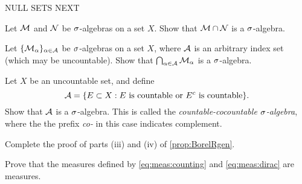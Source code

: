 \documentclass[main.tex]{subfiles}
\begin{document}
NULL SETS NEXT


\begin{exercises}
\item Let ${\mathcal M}$ and ${\mathcal N}$ be ${\sigma}$-algebras on a set $X$. Show that ${\mathcal M} \cap {\mathcal N}$ is a ${\sigma}$-algebra.

\item Let $\{{\mathcal M}_\alpha\}_{\alpha\in {\mathcal A}}$ be ${\sigma}$-algebras on a set $X$, where ${\mathcal A}$ is an arbitrary index set (which may be uncountable). Show that $\bigcap_{\alpha\in {\mathcal A}}{\mathcal M}_\alpha$ is a ${\sigma}$-algebra.

\item Let $X$ be an uncountable set, and define
\[
{\mathcal A} = \{ E \subset X : E \text{ is countable or } E^c \text{ is countable} \}.
\]
Show that ${\mathcal A}$ is a ${\sigma}$-algebra. This is called the \emph{countable-cocountable ${\sigma}$-algebra}, where the the prefix \emph{co-} in this case indicates complement.

\item Complete the proof of parts (iii) and (iv) of \cref{prop:BorelRgen}.

\item Prove that the measures defined by \cref{eq:meas:counting} and \cref{eq:meas:dirac} are measures.
\end{exercises}
\end{document}
